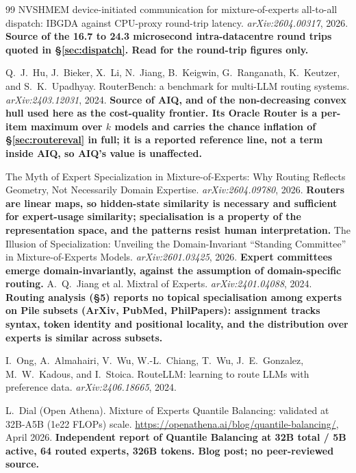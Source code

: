 \documentclass[11pt]{article}
\begin{document}
\begin{thebibliography}{99}
 NVSHMEM device-initiated communication for mixture-of-experts all-to-all dispatch: IBGDA against CPU-proxy round-trip latency. \emph{arXiv:2604.00317}, 2026. \textbf{Source of the 16.7 to 24.3 microsecond intra-datacentre round trips quoted in \S\ref{sec:dispatch}. Read for the round-trip figures only.}

 Q.~J.~Hu, J.~Bieker, X.~Li, N.~Jiang, B.~Keigwin, G.~Ranganath, K.~Keutzer, and S.~K.~Upadhyay. RouterBench: a benchmark for multi-LLM routing systems. \emph{arXiv:2403.12031}, 2024. \textbf{Source of AIQ, and of the non-decreasing convex hull used here as the cost-quality frontier. Its Oracle Router is a per-item maximum over $k$ models and carries the chance inflation of \S\ref{sec:routereval} in full; it is a reported reference line, not a term inside AIQ, so AIQ's value is unaffected.}

 The Myth of Expert Specialization in Mixture-of-Experts: Why Routing Reflects Geometry, Not Necessarily Domain Expertise. \emph{arXiv:2604.09780}, 2026. \textbf{Routers are linear maps, so hidden-state similarity is necessary and sufficient for expert-usage similarity; specialisation is a property of the representation space, and the patterns resist human interpretation.}
 The Illusion of Specialization: Unveiling the Domain-Invariant ``Standing Committee'' in Mixture-of-Experts Models. \emph{arXiv:2601.03425}, 2026. \textbf{Expert committees emerge domain-invariantly, against the assumption of domain-specific routing.}
 A.~Q.~Jiang et al. Mixtral of Experts. \emph{arXiv:2401.04088}, 2024. \textbf{Routing analysis (\S5) reports no topical specialisation among experts on Pile subsets (ArXiv, PubMed, PhilPapers): assignment tracks syntax, token identity and positional locality, and the distribution over experts is similar across subsets.}

 I.~Ong, A.~Almahairi, V.~Wu, W.-L.~Chiang, T.~Wu, J.~E.~Gonzalez, M.~W.~Kadous, and I.~Stoica. RouteLLM: learning to route LLMs with preference data. \emph{arXiv:2406.18665}, 2024.

 L.~Dial (Open Athena). Mixture of Experts Quantile Balancing: validated at 32B-A5B (1e22 FLOPs) scale. \url{https://openathena.ai/blog/quantile-balancing/}, April 2026. \textbf{Independent report of Quantile Balancing at 32B total / 5B active, 64 routed experts, 326B tokens. Blog post; no peer-reviewed source.}


\end{thebibliography}
\end{document}
